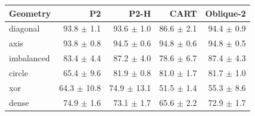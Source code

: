 \begin{tabular}{lrrrr}
\toprule
Geometry & P2 & P2-H & CART & Oblique-2 \\
\midrule
diagonal & 93.8 $\pm$ 1.1 & 93.6 $\pm$ 1.0 & 86.6 $\pm$ 2.1 & 94.4 $\pm$ 0.9 \\
axis & 93.8 $\pm$ 0.8 & 94.5 $\pm$ 0.6 & 94.8 $\pm$ 0.6 & 94.8 $\pm$ 0.5 \\
imbalanced & 83.4 $\pm$ 4.4 & 87.2 $\pm$ 4.0 & 78.6 $\pm$ 6.7 & 87.4 $\pm$ 4.3 \\
circle & 65.4 $\pm$ 9.6 & 81.9 $\pm$ 0.8 & 81.0 $\pm$ 1.7 & 81.7 $\pm$ 1.0 \\
xor & 64.3 $\pm$ 10.8 & 74.9 $\pm$ 13.1 & 51.5 $\pm$ 1.4 & 55.3 $\pm$ 8.6 \\
dense & 74.9 $\pm$ 1.6 & 73.1 $\pm$ 1.7 & 65.6 $\pm$ 2.2 & 72.9 $\pm$ 1.7 \\
\bottomrule
\end{tabular}
